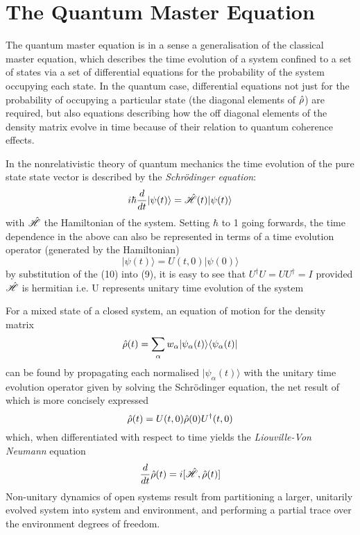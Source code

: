 
\section{The Quantum Master Equation}
The quantum master equation is in a sense a generalisation of the classical master equation, which describes the time evolution of a system confined to a set of states via a set of differential equations for the probability of the system occupying each state. In the quantum case, differential equations not just for the probability of occupying a particular state (the diagonal elements of $\hat{\rho}$) are required, but also equations describing how the off diagonal elements of the density matrix evolve in time because of their relation to quantum coherence effects.

In the nonrelativistic theory of quantum mechanics the time evolution of the pure state state vector is described by the \emph{Schr\"odinger equation}:
\begin{equation}
	i\hbar \frac{d}{dt} |\psi(t)\rangle = \hat{\mathscr{H}}(t) |\psi(t) \rangle
\end{equation}
with $\hat{\mathscr{H}}$ the Hamiltonian of the system. Setting $\hbar$ to 1 going forwards, the time dependence in the above can also be represented in terms of a time evolution operator (generated by the Hamiltonian)
\begin{equation}
	|\psi(t) \rangle = U(t, 0) | \psi(0) \rangle
\end{equation}
by substitution of the (10) into (9), it is easy to see that $U^{\dagger}U = UU^\dagger = I$ provided $\hat{\mathscr{H}}$ is hermitian i.e. U represents unitary time evolution of the system

For a mixed state of a closed system, an equation of motion for the density matrix
\begin{equation}
	\hat{\rho} (t) = \sum_\alpha w_{\alpha} |\psi_\alpha (t) \rangle \langle \psi_\alpha (t) |
\end{equation}
can be found by propagating each normalised $| \psi_\alpha (t) \rangle$ with the unitary time evolution operator given by solving the Schr\"odinger equation, the net result of which is more concisely expressed
\begin{equation}
	\hat{\rho} (t) = U(t, 0)\hat{\rho} (0) U^\dagger (t, 0)
\end{equation}
which, when differentiated with respect to time yields the \emph{Liouville-Von Neumann} equation
\begin{equation}
	\frac{d}{dt}\hat{\rho}(t) = i [\hat{\mathscr{H}}, \hat{\rho} (t) ]
\end{equation}
Non-unitary dynamics of open systems result from partitioning a larger, unitarily evolved system into system and environment, and performing a partial trace over the environment degrees of freedom.

